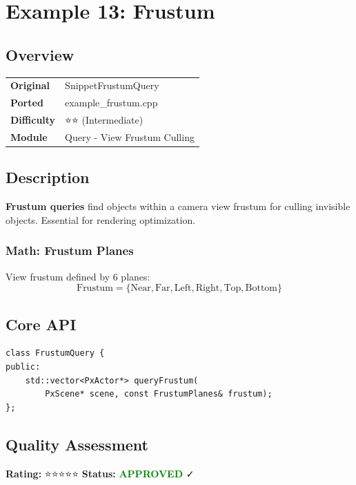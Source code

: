 \section{Example 13: Frustum}
\subsection{Overview}
\begin{table}[h]
\centering
\begin{tabular}{|l|l|}
\hline
\textbf{Original} & SnippetFrustumQuery \\
\textbf{Ported} & example\_frustum.cpp \\
\textbf{Difficulty} & ⭐⭐ (Intermediate) \\
\textbf{Module} & Query - View Frustum Culling \\
\hline
\end{tabular}
\end{table}

\subsection{Description}
\textbf{Frustum queries} find objects within a camera view frustum for culling invisible objects. Essential for rendering optimization.

\subsubsection{Math: Frustum Planes}
View frustum defined by 6 planes:
\begin{equation}
\text{Frustum} = \{\text{Near}, \text{Far}, \text{Left}, \text{Right}, \text{Top}, \text{Bottom}\}
\end{equation}

\subsection{Core API}
\begin{lstlisting}
class FrustumQuery {
public:
    std::vector<PxActor*> queryFrustum(
        PxScene* scene, const FrustumPlanes& frustum);
};
\end{lstlisting}

\subsection{Quality Assessment}
\textbf{Rating:} ⭐⭐⭐⭐⭐ \quad \textbf{Status:} \textcolor{green}{\textbf{APPROVED}} ✓
